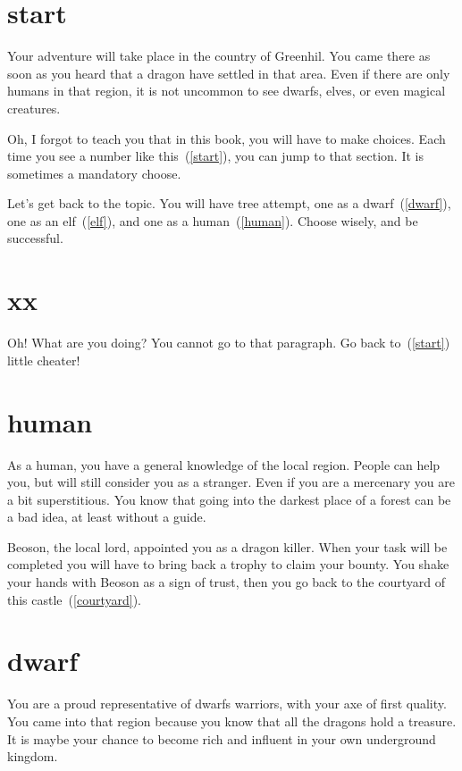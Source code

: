 \section{start}

Your adventure will take place in the country of Greenhil. You came there as soon
as you heard that a dragon have settled in that area. Even if there are only
humans in that region, it is not uncommon to see dwarfs, elves, or even magical
creatures.

Oh, I forgot to teach you that in this book, you will have to make choices. Each
time you see a number like this~(\ref{start}), you can jump to that section.
It is sometimes a mandatory choose.

Let's get back to the topic. You will have tree attempt, one as a
dwarf~(\ref{dwarf}), one as an elf~(\ref{elf}), and one as a
human~(\ref{human}). Choose wisely, and be successful.

\section{xx}

Oh! What are you doing? You cannot go to that paragraph. Go back
to~(\ref{start}) little cheater!

\section{human}

As a human, you have a general knowledge of the local region. People can help
you, but will still consider you as a stranger. Even if you are a mercenary you
are a bit superstitious. You know that going into the darkest place of a forest
can be a bad idea, at least without a guide.

Beoson, the local lord, appointed you as a dragon killer. When your task will be
completed you will have to bring back a trophy to claim your bounty. You shake
your hands with Beoson as a sign of trust, then you go back to the courtyard of
this castle~(\ref{courtyard}).

\section{dwarf}

You are a proud representative of dwarfs warriors, with your axe of first
quality. You came into that region because you know that all the dragons hold a
treasure. It is maybe your chance to become rich and influent in your own
underground kingdom.

